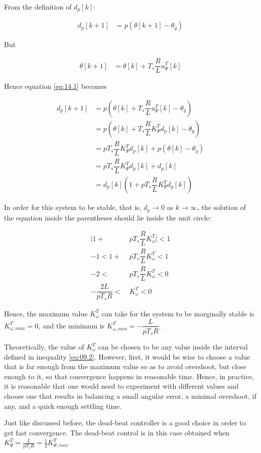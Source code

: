 From the definition of $d_p[k]$:

\begin{align}
  d_p[k+1] &= p (\theta[k+1] - \theta_g) \label{eq:14.1}
\end{align}

But

\begin{align*}
  \theta[k+1] &= \theta[k] + T_s \dfrac{R}{L} u_{\Psi}^T[k]
\end{align*}

Hence equation \ref{eq:14.1} becomes

\begin{align*}
  d_p[k+1] &= p (\theta[k] + T_s \dfrac{R}{L} u_{\Psi}^T[k] - \theta_g) \\
           &= p(\theta[k] + T_s \dfrac{R}{L} K_{\Psi}^T d_p[k] - \theta_g)  \\
           &= p T_s \dfrac{R}{L} K_{\Psi}^T d_p[k] + p (\theta[k] - \theta_g) \\
           &= p T_s \dfrac{R}{L} K_{\Psi}^T d_p[k] + d_p[k] \\
           &= d_p[k] (1 + p T_s \dfrac{R}{L} K_{\Psi}^T d_p[k])
\end{align*}

In order for this system to be stable, that is, $d_p \to 0$ as $k \to \infty$,
the solution of the equation inside the parentheses should lie inside the unit
circle:

\begin{align}
  \Big|1 + &p T_s \dfrac{R}{L} K_{\omega}^T\Big| < 1 \nonumber \\
  -1 < 1 + &p T_s \dfrac{R}{L} K_{\omega}^T < 1 \nonumber \\
  -2 < &p T_s \dfrac{R}{L} K_{\omega}^T < 0 \nonumber \\
  -\dfrac{2L}{p T_s R} <\ &K_{\omega}^T < 0 \label{eq:14.2}
\end{align}

Hence, the maximum value $K_{\omega}^T$ can take for the system to be marginally
stable is $K_{\omega,max}^T = 0$, and the minimum is
$K_{\omega,min}^T = -\dfrac{L}{p T_s R}$.

Theoretically, the value of $K_{\omega}^T$ can be chosen to be any value inside
the interval defined in inequality \ref{eq:09.2}. However, first, it would be
wise to choose a value that is far enough from the maximum value so as to avoid
overshoot, but close enough to it, so that convergence happens in reasonable
time. Hence, in practice, it is reasonable that one would need to experiment
with different values and choose one that results in balancing a small angular
error, a minimal overshoot, if any, and a quick enough settling time.

Just like discussed before, the dead-beat controller is a good choice in order to
get fast convergence. The dead-beat control is in this case obtained when
$K_\Psi ^T = \frac{L}{pT_s R} = \frac{1}{2}K_{\Psi,min} ^T$.
